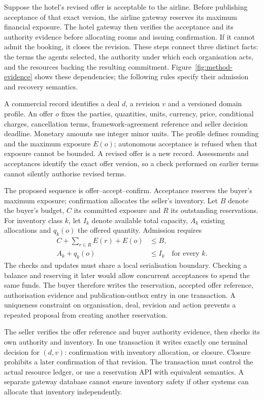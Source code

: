 Suppose the hotel's revised offer is acceptable to the airline. Before publishing acceptance of that exact version, the airline gateway reserves its maximum financial exposure. The hotel gateway then verifies the acceptance and its authority evidence before allocating rooms and issuing confirmation. If it cannot admit the booking, it closes the revision. These steps connect three distinct facts: the terms the agents selected, the authority under which each organisation acts, and the resources backing the resulting commitment. Figure~\ref{fig:method-evidence} shows these dependencies; the following rules specify their admission and recovery semantics.


A commercial record identifies a deal $d$, a revision $v$ and a versioned domain profile. An offer $o$ fixes the parties, quantities, units, currency, price, conditional charges, cancellation terms, framework-agreement reference and seller decision deadline. Monetary amounts use integer minor units. The profile defines rounding and the maximum exposure $E(o)$; autonomous acceptance is refused when that exposure cannot be bounded. A revised offer is a new record. Assessments and acceptances identify the exact offer version, so a check performed on earlier terms cannot silently authorise revised terms.

The proposed sequence is offer--accept--confirm. Acceptance reserves the buyer's maximum exposure; confirmation allocates the seller's inventory. Let $B$ denote the buyer's budget, $C$ its committed exposure and $R$ its outstanding reservations. For inventory class $k$, let $I_k$ denote available total capacity, $A_k$ existing allocations and $q_k(o)$ the offered quantity. Admission requires
\begin{align}
C+\sum_{r\in R}E(r)+E(o)&\leq B,
\label{eq:method-budget}\\
A_k+q_k(o)&\leq I_k\quad\text{for every }k.
\label{eq:method-stock}
\end{align}
The checks and updates must share a local serialisation boundary. Checking a balance and reserving it later would allow concurrent acceptances to spend the same funds. The buyer therefore writes the reservation, accepted offer reference, authorisation evidence and publication-outbox entry in one transaction. A uniqueness constraint on organisation, deal, revision and action prevents a repeated proposal from creating another reservation.

The seller verifies the offer reference and buyer authority evidence, then checks its own authority and inventory. In one transaction it writes exactly one terminal decision for $(d,v)$: confirmation with inventory allocation, or closure. Closure prohibits a later confirmation of that revision. The transaction must control the actual resource ledger, or use a reservation API with equivalent semantics. A separate gateway database cannot ensure inventory safety if other systems can allocate that inventory independently.

